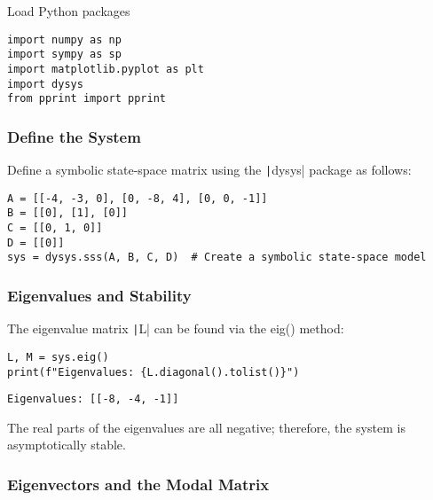 \label{cec40bd4}
Load Python packages

\label{bd3a6a21}
\nointerlineskip\nointerlineskip\begin{verbatim}
import numpy as np
import sympy as sp
import matplotlib.pyplot as plt
import dysys
from pprint import pprint
\end{verbatim}

\label{4c365de9}

\label{756a411f}
\subsubsection{Define the System}\label{define-the-system}

Define a symbolic state-space matrix using the \texttt|dysys|
package as follows:

\label{f634d35e}
\nointerlineskip\nointerlineskip\begin{verbatim}
A = [[-4, -3, 0], [0, -8, 4], [0, 0, -1]]
B = [[0], [1], [0]]
C = [[0, 1, 0]]
D = [[0]]
sys = dysys.sss(A, B, C, D)  # Create a symbolic state-space model
\end{verbatim}

\label{c8734e57}
\subsubsection{Eigenvalues and
Stability}\label{eigenvalues-and-stability}

The eigenvalue matrix \texttt|L| can be found via the eig()
method:

\label{32e3ee2b}
\nointerlineskip\nointerlineskip\begin{verbatim}
L, M = sys.eig()
print(f"Eigenvalues: {L.diagonal().tolist()}")
\end{verbatim}

\nointerlineskip\nointerlineskip\begin{verbatim}
Eigenvalues: [[-8, -4, -1]]
\end{verbatim}

\label{83c9c043}
The real parts of the eigenvalues are all negative; therefore, the
system is asymptotically stable.

\label{867e3e2d}
\subsubsection{Eigenvectors and the Modal
Matrix}\label{eigenvectors-and-the-modal-matrix}

